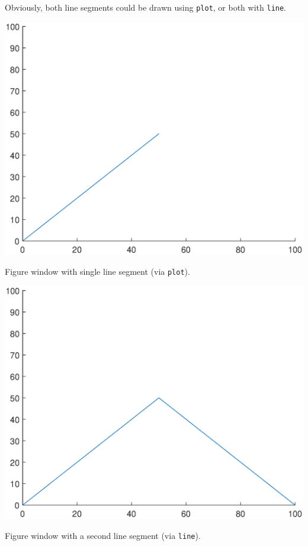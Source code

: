 \documentclass{tufte-book} %
\begin{document}
\noindent Obviously, both line segments could be drawn using \texttt{plot}, or both with \texttt{line}.

\begin{marginfigure}[0.5in]
\includegraphics[width=\linewidth]{ch3-graphics02.eps}
\caption{Figure window with single line segment (via \texttt{plot}).}
\label{fig:ch3-graphics02}
\end{marginfigure}

\begin{marginfigure}[0.0in]
\includegraphics[width=\linewidth]{ch3-graphics03.eps}
\caption{Figure window with a second line segment (via \texttt{line}).}
\label{fig:ch3-graphics03}
\end{marginfigure}
\end{document}
